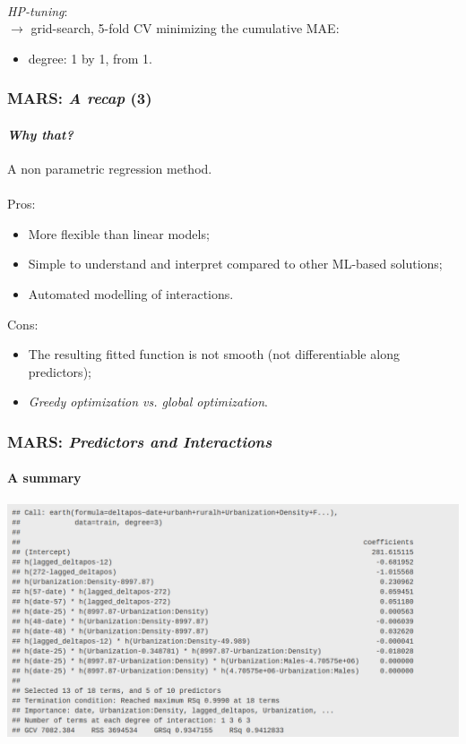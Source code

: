 \documentclass{beamer}
\begin{document}
{\begin{frame}[t]
	~\\ \textit{HP-tuning}: \\
	$\rightarrow$ grid-search, 5-fold CV minimizing the cumulative MAE:
	\begin{itemize}
		\item degree: 1 by 1, from 1.
	\end{itemize}

\end{frame}

\begin{frame}[t]
	\frametitle{MARS: \textit{A recap} (3)}
	\framesubtitle{\textit{Why that?}}
	A non parametric regression method.
	\\~\\
	Pros:
	\begin{itemize}
		\item More flexible than linear models;
		\item Simple to understand and interpret compared to other ML-based solutions;
		\item Automated modelling of interactions.
	\end{itemize}


	Cons:
	\begin{itemize}
		\item The resulting fitted function is not smooth (not differentiable along predictors);
		\item \textit{Greedy optimization vs. global optimization}.
	\end{itemize}
\end{frame}

\begin{frame}
	\frametitle{MARS: \textit{Predictors and Interactions}}
	\framesubtitle{A summary}
	\center \includegraphics[scale = 0.26]{summary_mars.png}
\end{frame}

}
\end{document}
